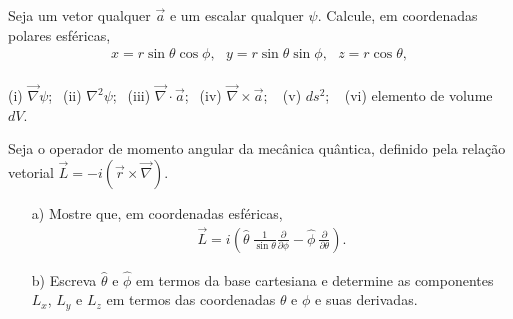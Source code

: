 \documentclass[a4paper,12pt]{article}
\begin{document}

\indent \par Seja um vetor qualquer $\vec{a}$ e um escalar qualquer $\psi$. Calcule, em coordenadas polares esféricas, 
%
\begin{eqnarray}
\nonumber
x=r \sin \theta \cos \phi, ~~~ y=r \sin \theta \sin \phi, ~~~ z=r \cos \theta ,
\end{eqnarray}\\
%
\noindent (i) $\vec{\nabla} \psi$; $~~$(ii) $\nabla^2 \psi$; $~~$(iii) $\vec{\nabla} \cdot \vec{a}$; $~~$(iv) $\vec{\nabla} \times \vec{a}$; $~~$ (v) $ds^2$; $~~$ (vi) elemento de volume $dV$.\\ 

\newpage
{}

\indent \par Seja o operador de momento angular da mecânica quântica, definido pela relação vetorial $\vec{L}=-i(\vec{r}\times \vec{\nabla})$.  
%
\begin{itemize}
 \item[a)] Mostre que, em coordenadas esféricas,
\begin{eqnarray}
\nonumber
\vec{L} = i\left( \hat{\theta}~\frac{1}{\sin \theta} \frac{\partial}{\partial \phi} - \hat{\phi} ~\frac{\partial}{\partial \theta} \right) .
\end{eqnarray}
%
\item[b)] Escreva $\hat{\theta}$ e $\hat{\phi}$ em termos da base cartesiana e determine as componentes $L_{x}$, $L_{y}$ e $L_{z}$ em termos das coordenadas $\theta$ e $\phi$ e suas derivadas.



\end{itemize}
\end{document}
